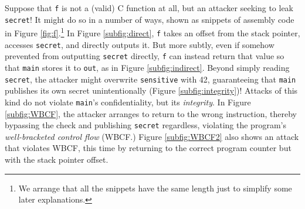 \documentclass[10pt,conference]{ieeetran}%
\theoremstyle{definition}
\begin{document}
Suppose that {\tt f} is not a (valid) C function at all, but an attacker seeking
to leak {\tt secret}! It might do so in a number of ways, shown as snippets of
assembly code in Figure \ref{fig:f}.\footnote{We arrange that all the snippets
have the same length just to simplify some later explanations.}
%
In Figure \ref{subfig:direct}, {\tt f} takes an offset from the stack
pointer, accesses {\tt secret}, and directly outputs it. But more
subtly, even if somehow prevented from outputting {\tt secret} directly, {\tt f}
can instead return that value so that {\tt main} stores it to {\tt out},
as in Figure \ref{subfig:indirect}.
%
Beyond simply reading {\tt secret}, the attacker might overwrite {\tt sensitive}
with 42, guaranteeing that {\tt main} publishes its own secret unintentionally
(Figure \ref{subfig:integrity})!
Attacks of this kind do not violate {\tt main}'s confidentiality, but its
{\it integrity}.
In Figure \ref{subfig:WBCF}, the attacker arranges to return to the
wrong instruction, thereby bypassing the check and publishing {\tt secret} regardless,
violating the program's {\it well-bracketed control flow} (WBCF.) Figure \ref{subfig:WBCF2}
also shows an attack that violates WBCF, this time by returning to the correct
program counter but with the stack pointer offset.
\end{document}
